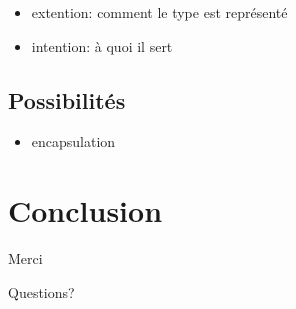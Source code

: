 \documentclass{beamer}
\begin{document}
\begin{frame}
    \begin{itemize}
        \item extention: comment le type est représenté
        \item intention: à quoi il sert
    \end{itemize}
\end{frame}

\subsection{Possibilités}

\begin{frame}
\begin{itemize}
\item encapsulation
\end{itemize}
\end{frame}

\section{Conclusion}

\begin{frame}
    Merci

    Questions?
\end{frame}
\end{document}
